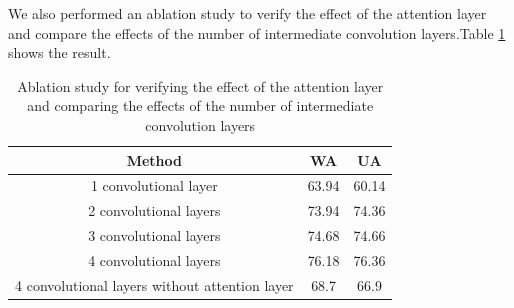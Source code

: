 \documentclass[10pt, conference, compsocconf]{IEEEtran}
\begin{document}
We also performed an ablation study to verify the effect of the attention layer and compare the effects of the number of intermediate convolution layers.Table \ref{ablation}
shows the result.
\begin{table}[h] 
	\renewcommand\arraystretch{1.5}
	\setlength{\abovecaptionskip}{-0.2cm}
	\caption{Ablation study for verifying the effect of the attention layer and comparing the effects of the number of intermediate convolution layers}
	\label{ablation}
	\begin{center}  
		\begin{tabular}{|c|c|c|} 
			\hline  
			Method & WA & UA\\   
			\hline  
			1 convolutional layer & 63.94 & 60.14 \\   
			\hline
			2 convolutional layers &73.94 & 74.36 \\   			
			\hline
			3 convolutional layers & 74.68 & 74.66 \\   
			\hline
			4 convolutional layers & 76.18 & 76.36 \\   
			\hline
			4 convolutional layers
			without attention layer & 68.7 & 66.9 \\   
			\hline
		\end{tabular}  
	\end{center}  
\end{table}
%
%

\end{document}

